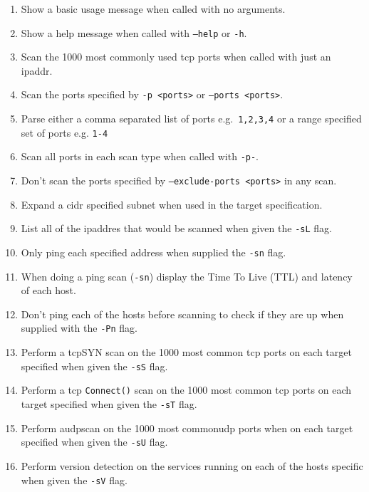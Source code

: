 \documentclass[titlepage]{article}
\begin{document}
\begin{enumerate}
  \item{%
    Show a basic usage message when called with no arguments.
  }
  \item{%
    Show a help message when called with \texttt{--help} or \texttt{-h}.
  
  }
  \item{%
    Scan the 1000 most commonly used \gls{tcp} \glspl{port} when called with just an \gls{ipaddr}.
  
  }
  \item{%
    Scan the \glspl{port} specified by \texttt{-p <ports>} or \texttt{--ports <ports>}.
  
  }
  \item{%
    Parse either a comma separated list of \glspl{port} e.g.\ \texttt{1,2,3,4}
    or a range specified set of \glspl{port} e.g. \texttt{1{-}4}
  }
  \item{%
    Scan all \glspl{port} in each scan type when called with \texttt{-p-}.
  
  }
  \item{%
    Don't scan the \glspl{port} specified by \texttt{--exclude-ports <ports>} in any scan.
  
  }
  \item{%
    Expand a \gls{cidr} specified \gls{subnet} when used in the target specification.
  
  }
  \item{%
    List all of the \gls{ipaddr}es that would be scanned when given the \texttt{-sL} flag.
  
  }
  \item{%
    Only ping each specified address when supplied the \texttt{-sn} flag.
  }
  \item{%
    When doing a ping scan (\texttt{-sn}) display the Time To Live (TTL)
    and latency of each host.
  }
  \item{%
    Don't ping each of the hosts before scanning to check if they are
    up when supplied with the \texttt{-Pn} flag.
  }
  \item{%
    Perform a \gls{tcp}SYN scan on the 1000 most common
    \gls{tcp} \glspl{port} on each target specified when given the \texttt{-sS} flag.
  }
  \item{%
    Perform a \gls{tcp} \verb|Connect()| scan on the 1000 most common
    \gls{tcp} \glspl{port} on each target specified when given the \texttt{-sT} flag.
  }
  \item{%
    Perform a\gls{udp}scan on the 1000 most common\gls{udp}
    \glspl{port} when on each target specified when given the \texttt{-sU} flag.
  }
  \item{%
    Perform version detection on the \glspl{service} running on
    each of the hosts specific when given the \texttt{-sV} flag.
  }
  \end{enumerate}
\end{document}
